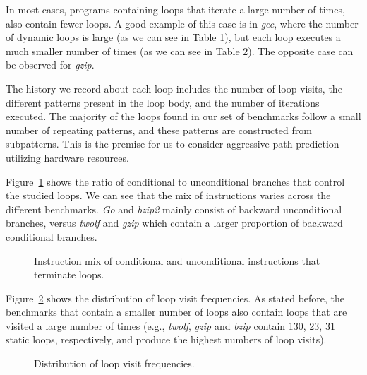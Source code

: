 \documentclass[times,10pt,twocolumn]{article}
\newcommand{\vs}{\vspace}
\begin{document}
In most cases, programs containing loops that
iterate a large number of times, also contain fewer loops. 
A good example of this case is in  {\it gcc}, where the 
number of dynamic loops is large (as we can see in Table 1), 
but each loop executes a much smaller number of times (as we can see 
in Table 2).  The opposite case can be observed for {\em gzip}.

The history we record about each loop includes 
the number of loop visits, the different patterns present in the loop body, 
and the number of iterations executed.  The majority of 
the loops found in our set of benchmarks 
follow a small number of repeating patterns, and 
these patterns are constructed from subpatterns.
This is the premise for us to consider aggressive path prediction
utilizing hardware resources.

Figure~\ref{fig:fig3} shows the ratio of conditional to unconditional 
branches that control the studied loops. We can see that the mix
of instructions varies across the different 
benchmarks. {\it Go} and {\it bzip2} mainly consist of backward 
unconditional branches, versus {\it twolf} and {\it gzip} which contain 
a larger proportion of backward conditional branches.    

\begin{figure}
\vspace{0.2 in}
\setlength{\epsfxsize}{10cm}%
\centerline{}
\caption{Instruction mix of conditional and unconditional instructions  that terminate loops.}
\label{fig:fig3}
\end{figure}


Figure~\ref{fig:fig4} shows the distribution of loop visit frequencies. 
As stated before, the benchmarks that contain a smaller number of loops 
also contain loops that are visited a large number of times 
(e.g., {\it twolf}, {\it gzip} and {\it bzip}
contain 130, 23, 31 static loops, respectively, and produce the highest 
numbers of loop visits).

\begin{figure}
\vspace{0.2 in}
\setlength{\epsfxsize}{10cm}%
\centerline{}
\caption{Distribution of loop visit frequencies.}
\label{fig:fig4}
\end{figure}
\end{document}
